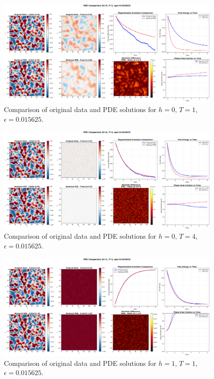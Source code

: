 \documentclass[11pt,a4paper]{article}
\begin{document}

\begin{figure}[!h]
    \centering
    \includegraphics[width=1.0\textwidth]{fig/pde_comparison_h0_T1_eps0.015625.png}
    \caption{Comparison of original data and PDE solutions for $h=0$, $T=1$, $\epsilon=0.015625$.}
    \label{fig:pde_comparison_h0_T1_eps0.015625}
\end{figure}


\begin{figure}[!h]
    \centering
    \includegraphics[width=1.0\textwidth]{fig/pde_comparison_h0_T4_eps0.015625.png}
    \caption{Comparison of original data and PDE solutions for $h=0$, $T=4$, $\epsilon=0.015625$.}
    \label{fig:pde_comparison_h0_T4_eps0.015625}
\end{figure}


\begin{figure}[!h]
    \centering
    \includegraphics[width=1.0\textwidth]{fig/pde_comparison_h1_T1_eps0.015625.png}
    \caption{Comparison of original data and PDE solutions for $h=1$, $T=1$, $\epsilon=0.015625$.}
    \label{fig:pde_comparison_h1_T1_eps0.015625}
\end{figure}
\end{document}
